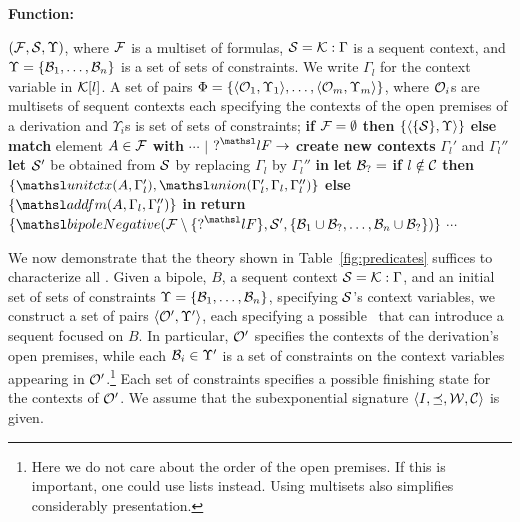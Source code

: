 \begin{algorithm}[pth]
\begin{small}
\textbf{Function:} \bipoleAux
 \begin{algorithmic}[1]
 \REQUIRE  $({\cal F}, {\cal S}, \Upsilon)$, where ${\cal F}$ is a multiset of
formulas,
${\cal S} = {\cal K} : \Gamma$ is a sequent context, and $\Upsilon =
\{\mathcal{B}_1, \ldots, \mathcal{B}_n\}$ is a set of sets of constraints.
We write $\Gamma_l$ for the context variable in ${\cal K}[l]$.
\ENSURE A set of pairs $\Phi = \{\langle{\cal O}_1, \Upsilon_1\rangle, \ldots,
\langle{\cal O}_m, \Upsilon_m\rangle \}$, 
where ${\cal O}_i$s are multisets of sequent
contexts each specifying the contexts of the open premises of
a derivation and $\Upsilon_i$s is set of sets of constraints;
\STATE \textbf{if} ${\cal F} = \emptyset$ \textbf{then} $\{\langle\{{\cal S}\},
\Upsilon\rangle\}$ \textbf{else match} element $A \in {\cal F}$ \textbf{with}
\STATE $\cdots$
\STATE $\mid$ $\nquest{l} F \rightarrow$ 
\STATE \qquad \textbf{create new contexts} $\Gamma_l'$ and $\Gamma_l''$
\STATE \qquad \textbf{let} ${\cal S}'$ be obtained from ${\cal S}$ by
replacing $\Gamma_l$ by $\Gamma_l''$ \textbf{in}
\STATE \qquad \textbf{let} $\mathcal{B}_? =$ \textbf{if} $l \notin {\cal C}$
\textbf{then} $\{ \elin{A}{\Gamma_l'},
\union{\Gamma_l'}{\Gamma_l}{\Gamma_l''} \}$ \textbf{else} $\{
\addform{A}{\Gamma_l}{\Gamma_l''} \}$ \textbf{in}
\STATE \qquad \textbf{return} $\{ \bipoleAux(\Fscr\setminus\{\nquest{l} F\},
\Sscr', \{\groundSet_1 \cup \groundSet_?, \ldots, \groundSet_n \cup
\groundSet_?\}) \}$
\STATE $\cdots$
\end{algorithmic}
\end{small}
\end{algorithm}

We now demonstrate that the theory shown in Table~\ref{fig:predicates}
suffices to characterize all \bDers. 
Given a bipole, $B$, a sequent
context ${\cal S} = {\cal K} : \Gamma$, and an initial set of sets of
constraints $\Upsilon = \{\mathcal{B}_1, \ldots, \mathcal{B}_n\}$,
specifying ${\cal S}$'s context variables, 
we construct a set of pairs $\langle{\cal O}', \Upsilon'\rangle$, each specifying a
possible \bDer\ that can introduce a sequent focused on $B$. In particular,
${\cal O}'$ specifies the contexts of the derivation's open premises,
while 
each ${\cal B}_i \in \Upsilon'$ is a set of constraints on the
context variables appearing in ${\cal O}'$.\footnote{Here we do not care
about the order of the open premises. If this is important, one could use
lists instead. Using multisets also simplifies considerably presentation.} 
Each set of constraints specifies a possible finishing state for the contexts of
${\cal O}'$.
We assume that the
subexponential signature $\langle I, \preceq, {\cal W}, {\cal C}\rangle$ is given. 


